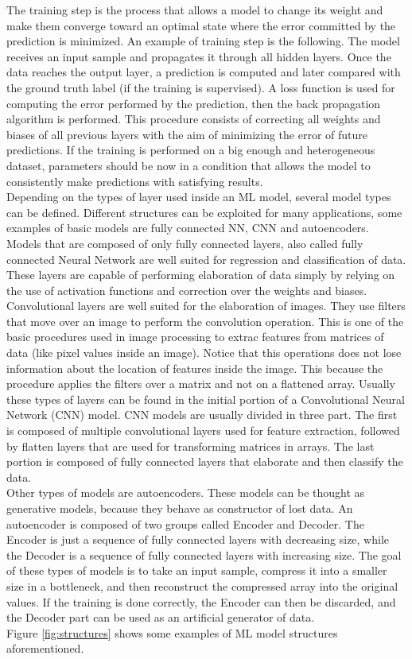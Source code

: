 \documentclass[12pt]{report}
\begin{document}
The training step is the process that allows a model to change its weight and make them converge toward an optimal state where the error committed by the prediction is minimized. An example of training step is the following. The model receives an input sample and propagates it through all hidden layers. Once the data reaches the output layer, a prediction is computed and later compared with the ground truth label (if the training is supervised). A loss function is used for computing the error performed by the prediction, then the back propagation algorithm is performed. This procedure consists of correcting all weights and biases of all previous layers with the aim of minimizing the error of future predictions. If the training is performed on a big enough and heterogeneous dataset, parameters should be now in a condition that allows the model to consistently make predictions with satisfying results.\\

Depending on the types of layer used inside an ML model, several model types can be defined. Different structures can be exploited for many applications, some examples of basic models are fully connected NN, CNN and autoencoders. \\
Models that are composed of only fully connected layers, also called fully connected Neural Network are well suited for regression and classification of data. These layers are capable of performing elaboration of data simply by relying on the use of activation functions and correction over the weights and biases. 
Convolutional layers are well suited for the elaboration of images. They use filters that move over an image to perform the convolution operation. This is one of the basic procedures used in image processing to extrac features from matrices of data (like pixel values inside an image). Notice that this operations does not lose information about the location of features inside the image. This because the procedure applies the filters over a matrix and not on a flattened array. Usually these types of layers can be found in the initial portion of a Convolutional Neural Network (CNN) model. CNN models are usually divided in three part. The first is composed of multiple convolutional layers used for feature extraction, followed by flatten layers that are used for transforming matrices in arrays. The last portion is composed of fully connected layers that elaborate and then classify the data.	\\
Other types of models are autoencoders. These models can be thought as generative models, because they behave as constructor of lost data. An autoencoder is composed of two groups called Encoder and Decoder. The Encoder is just a sequence of fully connected layers with decreasing size, while the Decoder is a sequence of fully connected layers with increasing size. The goal of these types of models is to take an input sample, compress it into a smaller size in a bottleneck, and then reconstruct the compressed array into the original values. If the training is done correctly, the Encoder can then be discarded, and the Decoder part can be used as an artificial generator of data.\\
Figure \ref{fig:structures} shows some examples of ML model structures aforementioned.
\end{document}
